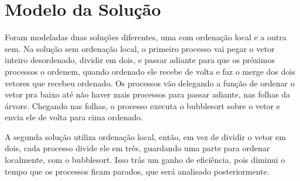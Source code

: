 \section{Modelo da Solução}

Foram modeladas duas soluções diferentes, uma com ordenação local e a outra sem. Na solução sem ordenação local, o primeiro processo vai pegar o vetor inteiro desordenado, dividir em dois, e passar adiante para que os próximos processos o ordenem, quando ordenado ele recebe de volta e faz o merge dos dois vetores que recebeu ordenado. Os processos vão delegando a função de ordenar o vetor pra baixo até não haver mais processos para passar adiante, nas folhas da árvore. Chegando nas folhas, o processo executa o bubblesort sobre o vetor e envia ele de volta para cima ordenado.

A segunda solução utiliza ordenação local, então, em vez de dividir o vetor em dois, cada processo divide ele em três, guardando uma parte para ordenar localmente, com o bubblesort. Isso trás um ganho de eficiência, pois diminui o tempo que os processos ficam parados, que será analisado posteriormente.
